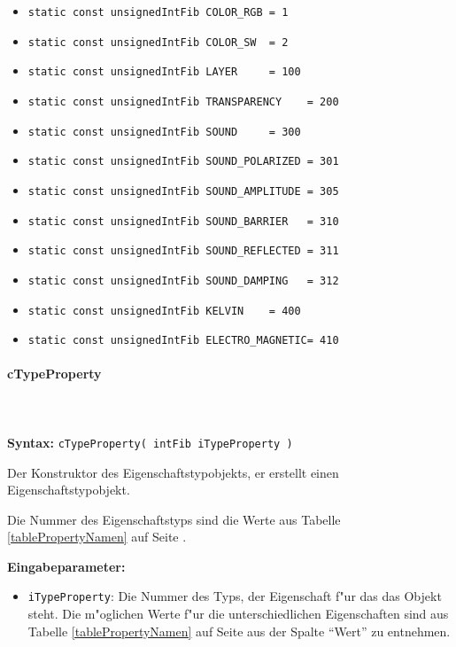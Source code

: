 \begin{itemize}
 \item \verb|static const unsignedIntFib COLOR_RGB = 1|
 \item \verb|static const unsignedIntFib COLOR_SW  = 2|
 \item \verb|static const unsignedIntFib LAYER     = 100|
 \item \verb|static const unsignedIntFib TRANSPARENCY    = 200|
 \item \verb|static const unsignedIntFib SOUND     = 300|
 \item \verb|static const unsignedIntFib SOUND_POLARIZED = 301|
 \item \verb|static const unsignedIntFib SOUND_AMPLITUDE = 305|
 \item \verb|static const unsignedIntFib SOUND_BARRIER   = 310|
 \item \verb|static const unsignedIntFib SOUND_REFLECTED = 311|
 \item \verb|static const unsignedIntFib SOUND_DAMPING   = 312|
 \item \verb|static const unsignedIntFib KELVIN    = 400|
 \item \verb|static const unsignedIntFib ELECTRO_MAGNETIC= 410|
\end{itemize}


\paragraph{cTypeProperty}

\ \\\\\noindent
\textbf{Syntax:} \verb|cTypeProperty( intFib iTypeProperty )|

\bigskip\noindent
Der Konstruktor des Eigenschaftstypobjekts, er erstellt einen Eigenschaftstypobjekt.

Die Nummer des Eigenschaftstyps sind die Werte aus Tabelle \ref{tablePropertyNamen} auf Seite \pageref{tablePropertyNamen} .

\bigskip\noindent
\textbf{Eingabeparameter:}
\begin{itemize}
 \item \verb|iTypeProperty|: Die Nummer des Typs, der Eigenschaft f"ur das das Objekt steht. Die m"oglichen Werte f"ur die unterschiedlichen Eigenschaften sind aus Tabelle \ref{tablePropertyNamen} auf Seite \pageref{tablePropertyNamen} aus der Spalte ``Wert'' zu entnehmen.
\end{itemize}

